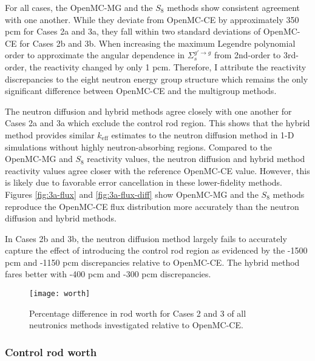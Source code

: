 For all cases, the OpenMC-MG and the $S_8$ methods show consistent agreement with one another. 
While they deviate from OpenMC-CE by approximately 350 pcm for Cases 2a and 3a, they fall within
two standard deviations of OpenMC-CE for Cases 2b and 3b. When increasing the maximum Legendre
polynomial order to approximate the angular dependence in $\Sigma_s^{g'\rightarrow g}$ from
2nd-order to 3rd-order, the reactivity changed by only 1 pcm. Therefore, I attribute the reactivity
discrepancies to the eight neutron energy group structure which remains the
only significant difference between OpenMC-CE and the multigroup methods.

The neutron diffusion and hybrid methods agree closely with one another for Cases 2a and 3a which
exclude the control rod region. This shows that the hybrid method provides similar $k_\text{eff}$
estimates to the neutron diffusion method in 1-D simulations without highly neutron-absorbing
regions. Compared to the OpenMC-MG and $S_8$ reactivity values, the neutron diffusion and hybrid
method reactivity values agree closer with the reference OpenMC-CE value. However, this is likely
due to favorable error cancellation in these lower-fidelity methods. Figures \ref{fig:3a-flux} and
\ref{fig:3a-flux-diff} show OpenMC-MG and the $S_8$ methods reproduce
the OpenMC-CE flux distribution more accurately than the neutron diffusion and hybrid methods.

In Cases 2b and 3b, the neutron diffusion method largely fails to accurately capture the
effect of introducing the control rod region as evidenced by the -1500 pcm and -1150 pcm
discrepancies relative to OpenMC-CE. The hybrid method fares better with -400 pcm and -300 pcm
discrepancies.

\begin{figure}[htb!]
  \centering
  \texttt{[image: worth]}
  \caption{Percentage difference in rod worth for Cases 2 and 3 of all neutronics methods
  investigated relative to OpenMC-CE.}
  \label{fig:1d-worth}
\end{figure}

\subsubsection{Control rod worth}

